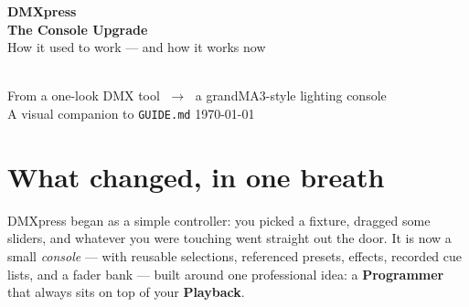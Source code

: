 \documentclass[11pt]{article}
\begin{document}
\begin{titlepage}
\centering
\vspace*{1.4cm}
{\fontsize{40}{44}\selectfont\bfseries\color{ink}DMXpress}\\[4pt]
{\Large\bfseries\color{accent}The Console Upgrade}\\[10pt]
{\large\color{cgray}How it used to work — and how it works now}\\[1.2cm]

\\[1.2cm]

{\large\color{ink}From a one-look DMX tool $\;\longrightarrow\;$ a grandMA3-style lighting console}\\[6pt]
{\color{cgray}\small A visual companion to \texttt{GUIDE.md} \;\textbullet\; \today}
\end{titlepage}

\section*{What changed, in one breath}

DMXpress began as a simple controller: you picked a fixture, dragged some
sliders, and whatever you were touching went straight out the door. It is now a
small \emph{console} — with reusable selections, referenced presets, effects,
recorded cue lists, and a fader bank — built around one professional idea: a
\textbf{Programmer} that always sits on top of your \textbf{Playback}.
\end{document}
